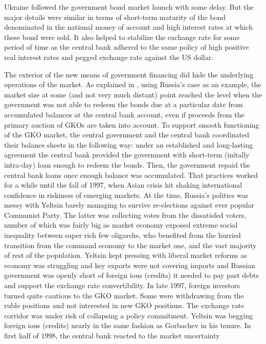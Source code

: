 Ukraine followed the government bond market launch with some delay. But
the major details were similar in terms of short-term maturity of the
bond denominated in the national money of account and high interest
rates at which these bond were sold. It also helped to stabilize the
exchange rate for some period of time as the central bank adhered to the
same policy of high positive real interest rates and pegged exchange
rate against the US dollar.

The exterior of the new means of government financing did hide the
underlying operations of the market. As explained in \citep{valchyshen_ru98},
using Russia's case as an example, the market size at some (and not very
much distant) point reached the level when the government was not able
to redeem the bonds due at a particular date from accumulated balances
at the central bank account, even if proceeds from the primary auction
of GKOs are taken into account. To support smooth functioning of the GKO
market, the central government and the central bank coordinated their
balance sheets in the following way: under an established and
long-lasting agreement the central bank provided the government with
short-term (initally intra-day) loan enough to redeem the bonds. Then,
the government repaid the central bank loans once enough balance was
accumulated. That practices worked for a while until the fall of 1997,
when Asian crisis hit shaking international confidence in riskiness of
emerging markets. At the time, Russia's politics was messy with Yeltsin
barely managing to survive re-elections against ever popular Communist
Party. The latter was collecting votes from the dissatisfed voters,
number of which was fairly big as market economy exposed extreme social
inequality between super rich few oligarchs, who benefited from the
hurried transition from the command economy to the market one, and the
vast majority of rest of the population. Yeltsin kept pressing with
liberal market reforms as economy was struggling and key exports were
not covering imports and Russian government was openly short of foreign
\acp{iou} (credits) it needed to pay past debts and support the exchange rate
convertibility. In late 1997, foreign investors turned quite cautious to
the GKO market. Some were withdrawing from the ruble positions and not
interested in new GKO positions. The exchange rate corridor was under
risk of collapsing a policy commitment. Yeltsin was begging foreign \acp{iou}
(credits) nearly in the same fashion as Gorbachev in his tenure. In
first half of 1998, the central bank reacted to the market uncertainty
